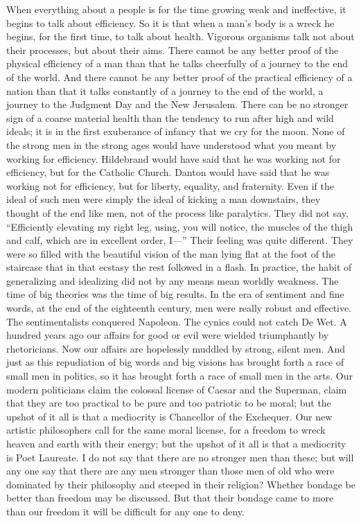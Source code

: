 When everything about a people is for the time growing weak and ineffective, it begins to talk about efficiency. So it is that when a man’s body is a wreck he begins, for the first time, to talk about health. Vigorous organisms talk not about their processes, but about their aims. There cannot be any better proof of the physical efficiency of a man than that he talks cheerfully of a journey to the end of the world. And there cannot be any better proof of the practical efficiency of a nation than that it talks constantly of a journey to the end of the world, a journey to the Judgment Day and the New Jerusalem. There can be no stronger sign of a coarse material health than the tendency to run after high and wild ideals; it is in the first exuberance of infancy that we cry for the moon. None of the strong men in the strong ages would have understood what you meant by working for efficiency. Hildebrand would have said that he was working not for efficiency, but for the Catholic Church. Danton would have said that he was working not for efficiency, but for liberty, equality, and fraternity. Even if the ideal of such men were simply the ideal of kicking a man downstairs, they thought of the end like men, not of the process like paralytics. They did not say, “Efficiently elevating my right leg, using, you will notice, the muscles of the thigh and calf, which are in excellent order, I—” Their feeling was quite different. They were so filled with the beautiful vision of the man lying flat at the foot of the staircase that in that ecstasy the rest followed in a flash. In practice, the habit of generalizing and idealizing did not by any means mean worldly weakness. The time of big theories was the time of big results. In the era of sentiment and fine words, at the end of the eighteenth century, men were really robust and effective. The sentimentalists conquered Napoleon. The cynics could not catch De Wet. A hundred years ago our affairs for good or evil were wielded triumphantly by rhetoricians. Now our affairs are hopelessly muddled by strong, silent men. And just as this repudiation of big words and big visions has brought forth a race of small men in politics, so it has brought forth a race of small men in the arts. Our modern politicians claim the colossal license of Caesar and the Superman, claim that they are too practical to be pure and too patriotic to be moral; but the upshot of it all is that a mediocrity is Chancellor of the Exchequer. Our new artistic philosophers call for the same moral license, for a freedom to wreck heaven and earth with their energy; but the upshot of it all is that a mediocrity is Poet Laureate. I do not say that there are no stronger men than these; but will any one say that there are any men stronger than those men of old who were dominated by their philosophy and steeped in their religion? Whether bondage be better than freedom may be discussed. But that their bondage came to more than our freedom it will be difficult for any one to deny.

